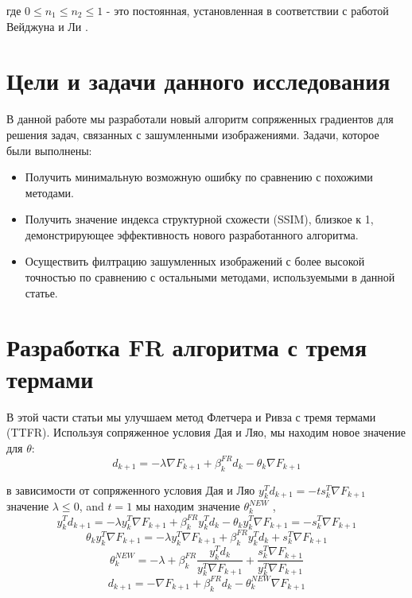 где $0 \le n_{1} \le n_{2} \le 1 $ - это постоянная, установленная в
соответствии с работой Вейджуна и Ли \cite{art17}.

\section{Цели и задачи данного исследования}

В данной работе мы разработали новый алгоритм сопряженных градиентов для решения
задач, связанных с зашумленными изображениями. Задачи, которое были выполнены:

\begin{itemize}
    \item Получить минимальную возможную ошибку по сравнению с похожими методами.
    \item Получить значение индекса структурной схожести (SSIM), близкое к 1,
        демонстрирующее эффективность нового разработанного алгоритма.
    \item Осуществить филтрацию зашумленных изображений с более высокой
        точностью по сравнению с остальными методами, используемыми в данной
        статье.
\end{itemize}

\section{Разработка FR алгоритма с тремя термами}

В этой части статьи мы улучшаем метод Флетчера и Ривза с тремя термами (TTFR).
Используя сопряженное условия Дая и Ляо, мы находим новое значение для $\theta$:
\begin{equation*}
    d_{k+1}=-\lambda \nabla F_{k+1}+\beta_{k}^{F R}d_{k}-\theta_{k}\nabla F_{k+1}
\end{equation*}

в зависимости от сопряженного условия Дая и Ляо $ y_{k}^{T}d_{k+1}=-t s_{k}^{T}\nabla F_{k+1} $
значение $ \lambda \le 0 $, and $ t = 1 $ мы находим значение $ \theta_{k}^{NEW}$ \cite{art7},
\begin{equation*}
    y_{k}^{T}d_{k+1}=-\lambda y_{k}^{T}\nabla F_{k+1}+\beta_{k}^{F R}y_{k}^{T}d_{k}-\theta_{k}y_{k}^{T}\nabla F_{k+1}=-s_{k}^{T}\nabla F_{k+1}
\end{equation*}
\begin{equation*}
    \theta_{k}y_{k}^{T}\nabla F_{k+1}=-\lambda y_{k}^{T}\nabla F_{k+1}+\beta_{k}^{F R}y_{k}^{T}d_{k}+s_{k}^{T}\nabla F_{k+1}
\end{equation*}
\begin{equation}\label{eqn:eq7}
    \theta_{k}^{N E W}=-\lambda+\beta_{k}^{F R}\frac{y_{k}^{T}d_{k}}{y_{k}^{T}\nabla F_{k+1}}+\frac{s_{k}^{T}\nabla F_{k+1}}{y_{k}^{T}\nabla F_{k+1}}
\end{equation}
\begin{equation}\label{eqn:eq8}
    d_{k+1}=-\nabla F_{k+1}+\beta_{k}^{F R}d_{k}-\theta_{k}^{N E W} \nabla F_{k+1}
\end{equation}

